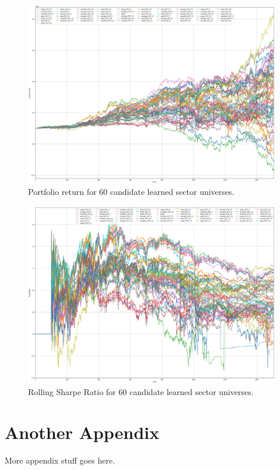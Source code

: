 \documentclass[../main.tex]{subfiles}
\begin{document}
\newpage
\begin{figure}
    \centering
    \includegraphics[width=\linewidth]{images/all_portfolio_return.png}
    \caption{Portfolio return for 60 candidate learned sector universes.}
    \label{fig:appendix_backtest:portfolio_return}
\end{figure}

\newpage
\begin{figure}
    \centering
    \includegraphics[width=\linewidth]{images/all_sharpe_ratio.png}
    \caption{Rolling Sharpe Ratio for 60 candidate learned sector universes.}
    \label{fig:appendix_backtest:sharpe_ratio}
\end{figure}


\chapter{Another Appendix}

More appendix stuff goes here.
\end{document}
